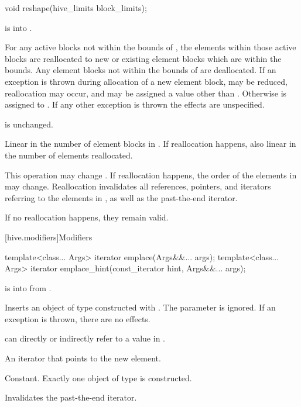 %
\begin{itemdecl}
void reshape(hive_limits block_limits);
\end{itemdecl}

\begin{itemdescr}
\pnum
\expects
{} is  into .

\pnum
\effects
For any active blocks not within the bounds of ,
the elements within those active blocks are reallocated
to new or existing element blocks which are within the bounds.
Any element blocks not within the bounds of 
are deallocated.
If an exception is thrown during allocation of a new element block,
 may be reduced,
reallocation may occur, and
 may be assigned
a value other than .
Otherwise  is assigned to .
If any other exception is thrown the effects are unspecified.

\pnum
\ensures
{} is unchanged.

\pnum
\complexity
Linear in the number of element blocks in .
If reallocation happens, also linear in the number of elements reallocated.

\pnum
\remarks
This operation may change .
If reallocation happens, the order of the elements in  may change.
Reallocation invalidates all references, pointers, and iterators
referring to the elements in ,
as well as the past-the-end iterator.
\begin{note}
If no reallocation happens, they remain valid.
\end{note}
\end{itemdescr}

[hive.modifiers]{Modifiers}

%
\begin{itemdecl}
template<class... Args> iterator emplace(Args&&... args);
template<class... Args> iterator emplace_hint(const_iterator hint, Args&&... args);
\end{itemdecl}

\begin{itemdescr}
\pnum
\expects
{} is  into  from .

\pnum
\effects
Inserts an object of type 
constructed with .
The  parameter is ignored.
If an exception is thrown, there are no effects.
\begin{note}
 can directly or indirectly refer to a value in .
\end{note}

\pnum
\returns
An iterator that points to the new element.

\pnum
\complexity
Constant. Exactly one object of type  is constructed.

\pnum
\remarks
Invalidates the past-the-end iterator.
\end{itemdescr}

